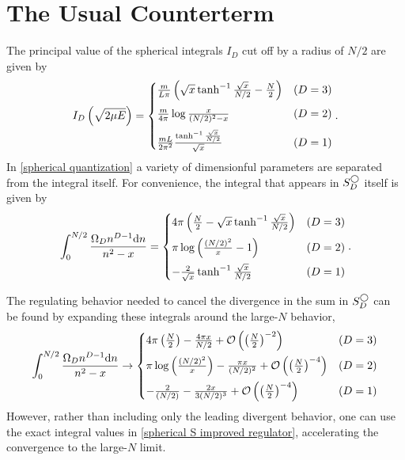 \section{The Usual Counterterm}\label{sec:counterterm/spherical}

The principal value of the spherical integrals $I_D$ cut off by a radius of $N/2$ are given by
\begin{equation}
    I_D\left(\sqrt{2\mu E}\right) = \begin{cases}
        \frac{m}{L\pi}\left(\sqrt{x}\tanh^{-1}\frac{\sqrt{x}}{N/2} - \frac{N}{2}\right)
            &   (D=3)\\[0.25cm]
        \frac{m}{4\pi} \log \frac{x}{(N/2)^2-x}
            &   (D=2)\\[0.25cm]
        \frac{m L}{2\pi^2} \frac{\tanh^{-1} \frac{\sqrt{x}}{N/2}}{\sqrt{x}}                     &   (D=1)
    \end{cases}.
\end{equation}
In \eqref{spherical quantization} a variety of dimensionful parameters are separated from the integral itself.  For convenience, the integral that appears in $S_D^\bigcirc$ itself is given by
\begin{equation}
    \label{eq:spherical S improved regulator}
    \int_0^{N/2} \frac{\Omega_D n^{D-1} \mathrm{d}n}{n^2-x} = \begin{cases}
        4\pi\left( \frac{N}{2} - \sqrt{x} \tanh^{-1} \frac{\sqrt{x}}{N/2}\right)
            &   (D=3)\\[0.25cm]
        \pi \log\left( \frac{(N/2)^2}{x} - 1\right)
            &   (D=2)\\[0.25cm]
        -\frac{2}{\sqrt{x}} \tanh^{-1} \frac{\sqrt{x}}{N/2}                     &   (D=1)
    \end{cases}.
\end{equation}

The regulating behavior needed to cancel the divergence in the sum in $S_D^\bigcirc$ can be found by expanding these integrals around the large-$N$ behavior,
\begin{equation}
    \int_0^{N/2} \frac{\Omega_D n^{D-1} \mathrm{d}n}{n^2-x} \rightarrow \begin{cases}
        4\pi \left(\frac{N}{2}\right) - \frac{4 \pi x}{N/2} + \mathcal{O}\left(\left(\frac{N}{2}\right)^{-2}\right)
            &   (D=3)\\[0.25cm]
        \pi \log \left(\frac{(N/2)^2}{x}\right) - \frac{\pi x}{(N/2)^2} + \mathcal{O}\left(\left(\frac{N}{2}\right)^{-4}\right)
            &   (D=2)\\[0.25cm]
        -\frac{2}{(N/2)} - \frac{2 x}{3 (N/2)^3} + \mathcal{O}\left(\left(\frac{N}{2}\right)^{-4}\right)
            &   (D=1)
    \end{cases}
\end{equation}
However, rather than including only the leading divergent behavior, one can use the exact integral values in \eqref{spherical S improved regulator}, accelerating the convergence to the large-$N$ limit.

